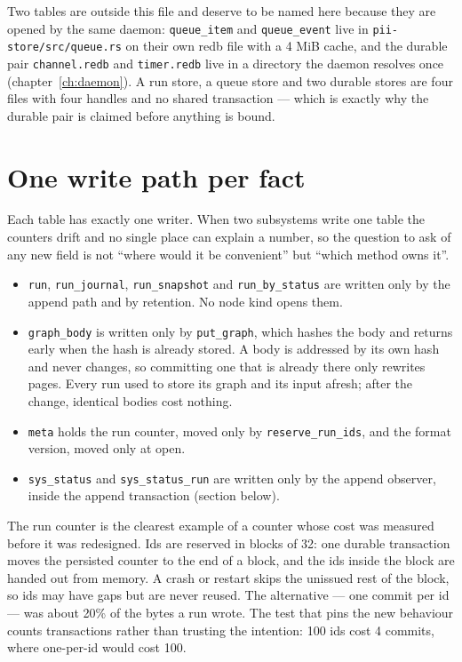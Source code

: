 Two tables are outside this file and deserve to be named here because they are opened by the
same daemon: \texttt{queue\_item} and \texttt{queue\_event} live in
\texttt{pii-store/src/queue.rs} on their own redb file with a 4 MiB cache, and the durable
pair \texttt{channel.redb} and \texttt{timer.redb} live in a directory the daemon resolves
once (chapter~\ref{ch:daemon}). A run store, a queue store and two durable stores are four
files with four handles and no shared transaction --- which is exactly why the durable pair is
claimed before anything is bound.

\section{One write path per fact}

Each table has exactly one writer. When two subsystems write one table the counters drift and
no single place can explain a number, so the question to ask of any new field is not ``where
would it be convenient'' but ``which method owns it''.

\begin{itemize}
	\item \texttt{run}, \texttt{run\_journal}, \texttt{run\_snapshot} and
	\texttt{run\_by\_status} are written only by the append path and by retention. No node kind
	opens them.
	\item \texttt{graph\_body} is written only by \texttt{put\_graph}, which hashes the body
	and returns early when the hash is already stored. A body is addressed by its own hash and
	never changes, so committing one that is already there only rewrites pages. Every run used
	to store its graph and its input afresh; after the change, identical bodies cost nothing.
	\item \texttt{meta} holds the run counter, moved only by \texttt{reserve\_run\_ids}, and
	the format version, moved only at open.
	\item \texttt{sys\_status} and \texttt{sys\_status\_run} are written only by the append
	observer, inside the append transaction (section below).
\end{itemize}

The run counter is the clearest example of a counter whose cost was measured before it was
redesigned. Ids are reserved in blocks of 32: one durable transaction moves the persisted
counter to the end of a block, and the ids inside the block are handed out from memory. A
crash or restart skips the unissued rest of the block, so ids may have gaps but are never
reused. The alternative --- one commit per id --- was about 20\% of the bytes a run wrote. The
test that pins the new behaviour counts transactions rather than trusting the intention: 100
ids cost 4 commits, where one-per-id would cost 100.

